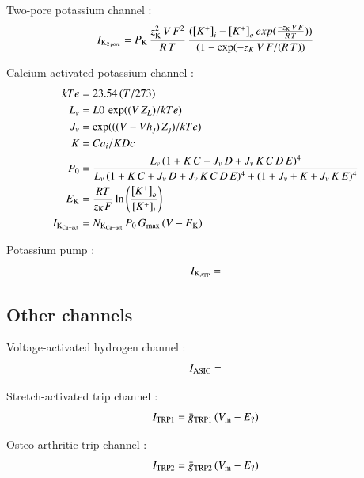 Two-pore potassium channel \citep{UNKNOWN}:
\begin{equation}
 I_{\rm K_{2\, pore}} = P_{\rm K}\, \frac{z_{\rm K}^2\, V\, F^{2}}{R\,
   T}\, \frac{({\left[K^{+}\right]_{i}} - {\left[K^{+}\right]_{o}}\,
 exp(\frac{-z_{\rm K}\, V\, F}{R\, T}))}{(1 - \exp(-z_K\, V\, F/(R\,
 T))}
\end{equation}

Calcium-activated potassium channel \citep{Horriganetal2002}:
\begin{equation}
  \begin{split}
    kTe & = 23.54\, (T/273)\\
    L_v & = L0\, \exp((V\, Z_L)/kTe)\\
    J_v & = \exp(((V - Vh_j)\, Z_j)/kTe)\\
    K & = Ca_i/KDc\\
    P_0 & = \frac{L_v\, (1+K\, C+J_v\, D+J_v\, K\, C\, D\, E)^4}
    {L_v\, (1+K\, C+J_v\, D+J_v\, K\, C\, D\, E)^4 +
      (1+J_v+K+J_v\, K\, E)^4}\\
    E_{\rm K} & =  \frac{R T}{z_{\rm K} F}
    \ln\left(\frac{\left[K^{+}\right]_{o}}
      {\left[K^{+}\right]_{i}}\right)\\
    I_{\rm K_{Ca-act}} & = N_{\rm K_{Ca-act}}\, P_0\, G_{\rm max}\, (V -
    E_{\rm K})
  \end{split}
\end{equation}

Potassium pump \citep{UNKNOWN}:
\begin{equation}
  I_{\rm K_{ATP}} =
\end{equation}

\subsection{Other channels}
\label{sec:other-channels}


Voltage-activated hydrogen channel \citep{UNKNOWN}:
\begin{equation}
  I_{\rm ASIC} =
\end{equation}

Stretch-activated trip channel \citep{UNKNOWN}:
\begin{equation}
  I_{\rm TRP1} = \bar{g}_{\rm TRP1}\, (V_{\rm m} - E_{\rm ?})
\end{equation}

Osteo-arthritic trip channel \citep{UNKNOWN}:
\begin{equation}
  I_{\rm TRP2} = \bar{g}_{\rm TRP2}\, (V_{\rm m} - E_{\rm ?})
\end{equation}


